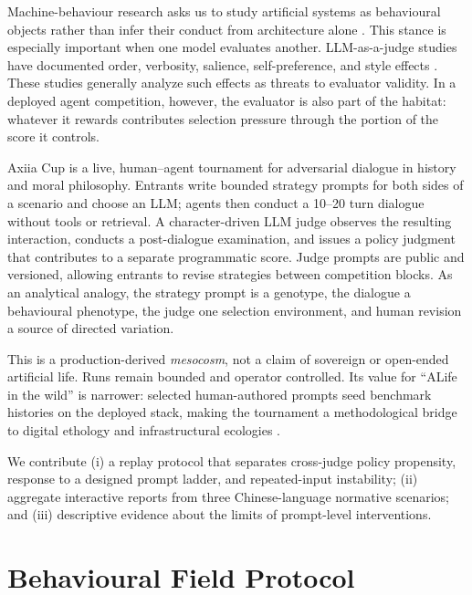 \documentclass[letterpaper]{article}
\begin{document}
Machine-behaviour research asks us to study artificial systems as behavioural objects rather than infer their conduct from architecture alone \citep{rahwan2019machine}. This stance is especially important when one model evaluates another. LLM-as-a-judge studies have documented order, verbosity, salience, self-preference, and style effects \citep{zheng2023judging,wang2024fair,koo2024benchmarking,panickssery2024evaluators,dubois2024length,feuer2025style}. These studies generally analyze such effects as threats to evaluator validity. In a deployed agent competition, however, the evaluator is also part of the habitat: whatever it rewards contributes selection pressure through the portion of the score it controls.

Axiia Cup is a live, human--agent tournament for adversarial dialogue in history and moral philosophy. Entrants write bounded strategy prompts for both sides of a scenario and choose an LLM; agents then conduct a 10--20 turn dialogue without tools or retrieval. A character-driven LLM judge observes the resulting interaction, conducts a post-dialogue examination, and issues a policy judgment that contributes to a separate programmatic score. Judge prompts are public and versioned, allowing entrants to revise strategies between competition blocks. As an analytical analogy, the strategy prompt is a genotype, the dialogue a behavioural phenotype, the judge one selection environment, and human revision a source of directed variation.

This is a production-derived \emph{mesocosm}, not a claim of sovereign or open-ended artificial life. Runs remain bounded and operator controlled. Its value for ``ALife in the wild'' is narrower: selected human-authored prompts seed benchmark histories on the deployed stack, making the tournament a methodological bridge to digital ethology and infrastructural ecologies \citep{hu2026wild}.

We contribute (i) a replay protocol that separates cross-judge policy propensity, response to a designed prompt ladder, and repeated-input instability; (ii) aggregate interactive reports from three Chinese-language normative scenarios; and (iii) descriptive evidence about the limits of prompt-level interventions.

\section{Behavioural Field Protocol}
\end{document}
